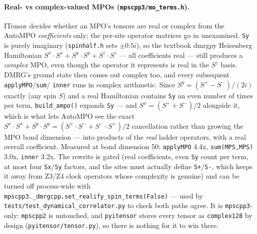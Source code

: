 \documentclass[11pt]{article}
\begin{document}
\paragraph{Real- vs complex-valued MPOs (\texttt{mpscpp3/mo\_terms.h}).}
ITensor decides whether an MPO's tensors are real or complex from the
AutoMPO \emph{coefficients} only; the per-site operator matrices go in
unexamined. \texttt{Sy} is purely imaginary (\texttt{spinhalf.h} sets
$\pm 0.5i$), so the textbook dmrgpy Heisenberg Hamiltonian
$S^x\!\cdot\!S^x + S^y\!\cdot\!S^y + S^z\!\cdot\!S^z$ --- all coefficients
real --- still produces a \emph{complex} MPO, even though the operator it
represents is real in the $S^z$ basis. DMRG's ground state then comes out
complex too, and every subsequent \texttt{applyMPO}/\texttt{sum}/
\texttt{inner} runs in complex arithmetic. Since
$S^y=(S^+-S^-)/(2i)$ exactly (any spin $S$) and a real Hamiltonian
contains \texttt{Sy} an even number of times per term,
\texttt{build\_ampo()} expands \texttt{Sy} --- and $S^x=(S^++S^-)/2$
alongside it, which is what lets AutoMPO see the exact
$S^x\!\cdot\!S^x+S^y\!\cdot\!S^y=(S^+\!\cdot\!S^-+S^-\!\cdot\!S^+)/2$
cancellation rather than growing the MPO bond dimension --- into products
of the \emph{real} ladder operators, with a real overall coefficient.
Measured at bond dimension 50: \texttt{applyMPO} 4.4x,
\texttt{sum(MPS,MPS)} 3.0x, \texttt{inner} 3.2x. The rewrite is gated
(real coefficients, even \texttt{Sy} count per term, at most four
\texttt{Sx}/\texttt{Sy} factors, and the sites must actually define
\texttt{S+}/\texttt{S-}, which keeps it away from Z3/Z4 clock operators
whose complexity is genuine) and can be turned off process-wide with
\texttt{mpscpp3.\_dmrgcpp.set\_realify\_spin\_terms(False)} --- used by
\texttt{tests/test\_dynamical\_correlator.py} to check both paths agree.
It is \texttt{mpscpp3}-only: \texttt{mpscpp2} is untouched, and
\texttt{pyitensor} stores every tensor as \texttt{complex128} by design
(\texttt{pyitensor/tensor.py}), so there is nothing for it to win there.
\end{document}
